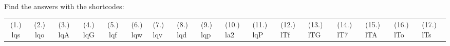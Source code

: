     
  \label{m38781**end}
          
       
    
  \label{464e844ca5615087ea89d9d95dd9a43a**end}
    
\par {} Find the answers with the shortcodes:
 \par \begin{tabular}[h]{cccccc}
 (1.) lqs  &  (2.) lqo  &  (3.) lqA  &  (4.) lqG  &  (5.) lqf  &  (6.) lqw  &  (7.) lqv  &  (8.) lqd  &  (9.) lqp  &  (10.) la2  &  (11.) lqP  &  (12.) lTf  &  (13.) lTG  &  (14.) lT7  &  (15.) lTA  &  (16.) lTo  &  (17.) lTs  & \end{tabular}



